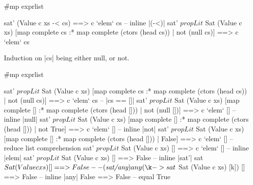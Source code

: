 
\h{#mp exprlist}\begin{code}
sat' (Value c xs -< cs) ==> c `elem` cs
    -- inline |(-<)|
sat' $ propLit $ Sat (Value c xs) [map complete cs :* map complete (ctors (head cs)) | not (null cs)] ==> c `elem` cs
\end{code}

Induction on |cs| being either null, or not.

\h{#mp exprlist}\begin{code}
sat' $ propLit $ Sat (Value c xs) [map complete cs :* map complete (ctors (head cs)) | not (null cs)] ==> c `elem` cs
    -- |cs == []|
sat' $ propLit $ Sat (Value c xs) [map complete [] :* map complete (ctors (head [])) | not (null [])] ==> c `elem` []
    -- inline |null|
sat' $ propLit $ Sat (Value c xs) [map complete [] :* map complete (ctors (head [])) | not True] ==> c `elem` []
    -- inline |not|
sat' $ propLit $ Sat (Value c xs) [map complete [] :* map complete (ctors (head [])) | False] ==> c `elem` []
    -- reduce list comprehension
sat' $ propLit $ Sat (Value c xs) [] ==> c `elem` []
    -- inline |elem|
sat' $ propLit $ Sat (Value c xs) [] ==> False
    -- inline |sat'|
sat $ Sat (Value c xs) [] ==> False
    -- \lemma{sat/any}
any (\k -> sat $ Sat (Value c xs) [k]) [] ==> False
    -- inline |any|
False ==> False
    -- equal
True
\end{code}

